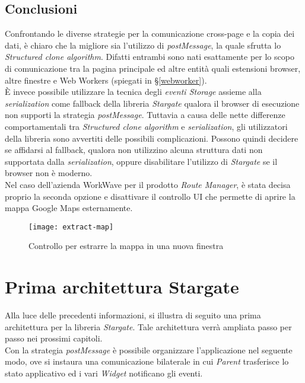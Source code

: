 \subsection{Conclusioni}

Confrontando le diverse strategie per la comunicazione cross-page e la copia dei dati, è chiaro che la migliore sia l'utilizzo di \textit{postMessage}, la quale sfrutta lo \textit{Structured clone algorithm}. Difatti entrambi sono nati esattamente per lo scopo di comunicazione tra la pagina principale ed altre entità quali estensioni browser, altre finestre e Web Workers (spiegati in §\ref{webworker}).\\

È invece possibile utilizzare la tecnica degli \textit{eventi Storage} assieme alla \textit{serialization} come fallback della libreria \textit{Stargate} qualora il browser di esecuzione non supporti la strategia \textit{postMessage}. Tuttavia a causa delle nette differenze comportamentali tra \textit{Structured clone algorithm} e \textit{serialization}, gli utilizzatori della libreria sono avvertiti delle possibili complicazioni. Possono quindi decidere se affidarsi al fallback, qualora non utilizzino alcuna struttura dati non supportata dalla \textit{serialization}, oppure disabilitare l'utilizzo di \textit{Stargate} se il browser non è moderno.\\

Nel caso dell'azienda WorkWave per il prodotto \textit{Route Manager}, è stata decisa proprio la seconda opzione e disattivare il controllo UI che permette di aprire la mappa Google Maps esternamente.

\begin{figure}[H] 
    \centering 
    \texttt{[image: extract-map]} 
    \caption{Controllo per estrarre la mappa in una nuova finestra}
\end{figure}

\section{Prima architettura Stargate}

Alla luce delle precedenti informazioni, si illustra di seguito una prima architettura per la libreria \textit{Stargate}. Tale architettura verrà ampliata passo per passo nei prossimi capitoli. \\

Con la strategia \textit{postMessage} è possibile organizzare l'applicazione nel seguente modo, ove si instaura una comunicazione bilaterale in cui \textit{Parent} trasferisce lo stato applicativo ed i vari \textit{Widget} notificano gli eventi. \\

